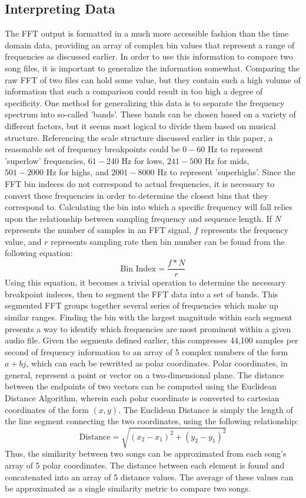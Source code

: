 \documentclass[conference]{IEEEtran}
\begin{document}
\subsection{Interpreting Data}
The FFT output is formatted in a much more accessible fashion than the time domain data, providing an array of complex bin values that represent a range of frequencies as discussed earlier. In order to use this information to compare two song files, it is important to generalize the information somewhat. Comparing the raw FFT of two files can hold some value, but they contain such a high volume of information that such a comparison could result in too high a degree of specificity. One method for generalizing this data is to separate the frequency spectrum into so-called 'bands'. These bands can be chosen based on a variety of different factors, but it seems most logical to divide them based on musical structure. Referencing the scale structure discussed earlier in this paper, a reasonable set of frequency breakpoints could be $0-60\text{ Hz}$ to represent 'superlow' frequencies, $61-240\text{ Hz}$ for lows, $241-500\text{ Hz}$ for mids, $501-2000\text{ Hz}$ for highs, and $2001-8000\text{ Hz}$ to represent 'superhighs'. Since the FFT bin indeces do not correspond to actual frequencies, it is necessary to convert these frequencies in order to determine the closest bins that they correspond to. Calculating the bin into which a specific frequency will fall relies upon the relationship between sampling frequency and sequence length. If $N$ represents the number of samples in an FFT signal, $f$ represents the frequency value, and $r$ represents sampling rate then bin number can be found from the following equation:
\begin{equation}\label{BinNum}
  \text{Bin Index}=\frac{f * N}{r}
\end{equation}
Using this equation, it becomes a trivial operation to determine the necessary breakpoint indeces, then to segment the FFT data into a set of bands. This segmented FFT groups together several series of frequencies which make up similar ranges. Finding the bin with the largest magnitude within each segment presents a way to identify which frequencies are most prominent within a given audio file. Given the segments defined earlier, this compresses 44,100 samples per second of frequency information to an array of 5 complex numbers of the form $a+bj$, which can each be rewritted as polar coordinates. Polar coordinates, in general, represent a point or vector on a two-dimensional plane. The distance between the endpoints of two vectors can be computed using the Euclidean Distance Algorithm, wherein each polar coordinate is converted to cartesian coordinates of the form $(x,y)$. The Euclidean Distance is simply the length of the line segment connecting the two coordinates, using the following relationship:
\begin{equation}\label{Euclidean}
  \text{Distance}=\sqrt{(x_2-x_1)^2 + (y_2-y_1)^2}
\end{equation}
Thus, the similarity between two songs can be approximated from each song's array of 5 polar coordinates. The distance between each element is found and concatenated into an array of 5 distance values. The average of these values can be approximated as a single similarity metric to compare two songs.
\end{document}
